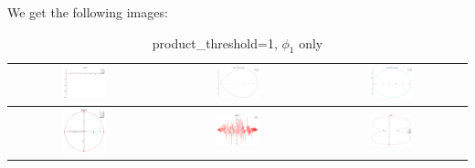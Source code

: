 \documentclass[a4paper,10pt]{article}
\begin{document}
 We get the following images:
 \begin{table}[!ht]
 \caption{product\_threshold=1, $\phi_1$ only}
 \begin{tabular}{|c|c|c|}
  \hline
  \includegraphics[width=0.3\textwidth]{PT_1_z1_1.png} &
  \includegraphics[width=0.3\textwidth]{PT_1_C1z1_1.png} &
  \includegraphics[width=0.3\textwidth]{PT_1_C2z1_1.png} \\ \hline
  \includegraphics[width=0.3\textwidth]{PT_1_z2_1.png} &
  \includegraphics[width=0.3\textwidth]{PT_1_zed_C0_1.png} &
  \includegraphics[width=0.3\textwidth]{PT_1_zed_1.png} \\ \hline
 \end{tabular}
 \end{table}
\end{document}
